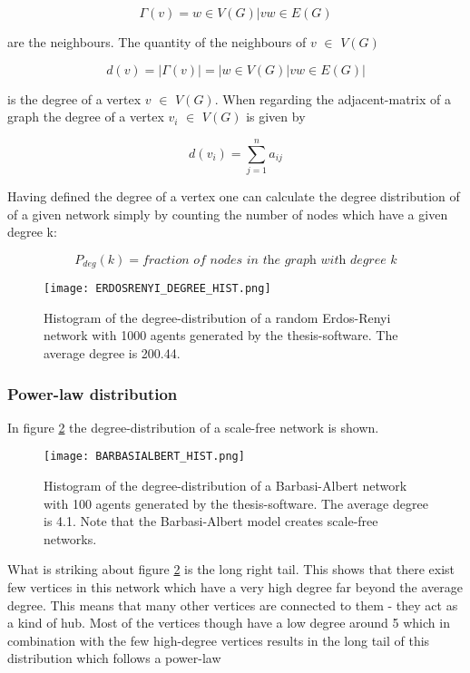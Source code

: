 \documentclass[../Bachelorarbeit.tex]{subfiles}
\begin{document}
\begin{equation}
\Gamma(v) = {w \in V(G) | vw \in E(G)}
\end{equation}

are the neighbours. The quantity of the neighbours of $v$ $\in$ $V(G)$ 

\begin{equation}
d(v) = |\Gamma(v)| = |{w \in V(G) | vw \in E(G)}|
\end{equation}

is the degree of a vertex $v$ $\in$ $V(G)$. When regarding the adjacent-matrix of a graph the degree of a vertex $v_i$ $\in$ $V(G)$ is given by

\begin{equation}
d(v_i) = \displaystyle\sum_{j=1}^{n} a_{ij}
\end{equation}

Having defined the degree of a vertex one can calculate the degree distribution of of a given network simply by counting the number of nodes which have a given degree k:

\begin{equation}
P_{deg}(k) = \textit{fraction of nodes in the graph with degree k}
\end{equation}

\begin{figure}[H]
	\centering
  \texttt{[image: ERDOSRENYI\_DEGREE\_HIST.png]}
  	\caption{Histogram of the degree-distribution of a random Erdos-Renyi network with 1000 agents generated by the thesis-software. The average degree is 200.44.}
	\label{fig:ERDOSRENYI_DEGREE_HIST}
\end{figure}

\subsubsection{Power-law distribution}
In figure \ref{fig:BARBASIALBERT_HIST} the degree-distribution of a scale-free network is shown.

\begin{figure}[H]
	\centering
  \texttt{[image: BARBASIALBERT\_HIST.png]}
  	\caption{Histogram of the degree-distribution of a Barbasi-Albert network with 100 agents generated by the thesis-software. The average degree is 4.1. Note that the Barbasi-Albert model creates scale-free networks.}
	\label{fig:BARBASIALBERT_HIST}
\end{figure}

What is striking about figure \ref{fig:BARBASIALBERT_HIST} is the long right tail. This shows that there exist few vertices in this network which have a very high degree far beyond the average degree. This means that many other vertices are connected to them - they act as a kind of hub. Most of the vertices though have a low degree around 5 which in combination with the few high-degree vertices results in the long tail of this distribution which follows a power-law
\end{document}
